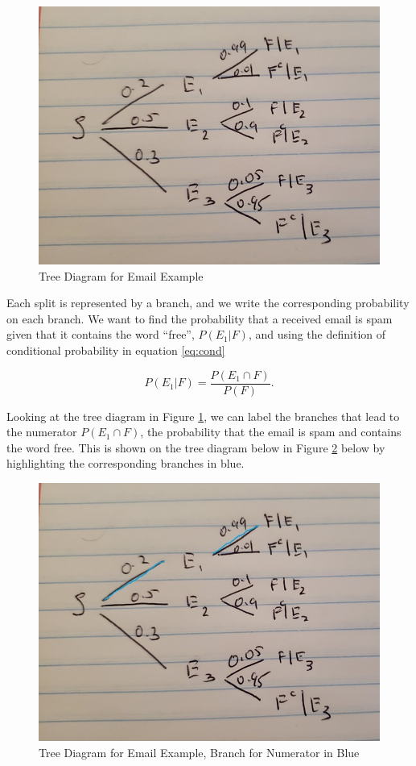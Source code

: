 \documentclass[
]{book}
\begin{document}
\begin{figure}
\centering
\includegraphics{images/02-tree.jpg}
\caption{\label{fig:tree}Tree Diagram for Email Example}
\end{figure}

Each split is represented by a branch, and we write the corresponding probability on each branch. We want to find the probability that a received email is spam given that it contains the word ``free'', \(P(E_1|F)\), and using the definition of conditional probability in equation \eqref{eq:cond}

\[
P(E_1|F) = \frac{P(E_1 \cap F)}{P(F)}.
\]

Looking at the tree diagram in Figure \ref{fig:tree}, we can label the branches that lead to the numerator \(P(E_1 \cap F)\), the probability that the email is spam and contains the word free. This is shown on the tree diagram below in Figure \ref{fig:tree1} below by highlighting the corresponding branches in blue.

\begin{figure}
\centering
\includegraphics{images/02-treepath1.jpg}
\caption{\label{fig:tree1}Tree Diagram for Email Example, Branch for Numerator in Blue}
\end{figure}
\end{document}
